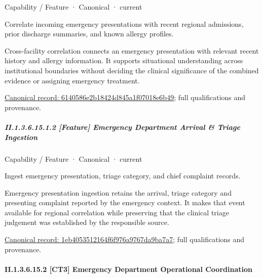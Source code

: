 \label{element:6140586e2b18424d845a1f07018e6b49}
{\small Capability / Feature · Canonical · current}\par

Correlate incoming emergency presentations with recent regional admissions, prior discharge summaries, and known allergy profiles.



Cross-facility correlation connects an emergency presentation with relevant recent history and allergy information. It supports situational understanding across institutional boundaries without deciding the clinical significance of the combined evidence or assigning emergency treatment.


{\footnotesize \href{../../../../continuum/strategy/capability/feature/6140586e2b18424d845a1f07018e6b49.md}{Canonical record: 6140586e2b18424d845a1f07018e6b49}; full qualifications and provenance.}\par
\subparagraph*{II.1.3.6.15.1.2 [Feature] Emergency Department Arrival \& Triage Ingestion}
\label{navigation:II.1.3.6.15.1.2}

\label{element:1eb4053512164f6f976a9767da9ba7a7}
{\small Capability / Feature · Canonical · current}\par

Ingest emergency presentation, triage category, and chief complaint records.



Emergency presentation ingestion retains the arrival, triage category and presenting complaint reported by the emergency context. It makes that event available for regional correlation while preserving that the clinical triage judgement was established by the responsible source.


{\footnotesize \href{../../../../continuum/strategy/capability/feature/1eb4053512164f6f976a9767da9ba7a7.md}{Canonical record: 1eb4053512164f6f976a9767da9ba7a7}; full qualifications and provenance.}\par
\paragraph*{II.1.3.6.15.2 [CT3] Emergency Department Operational Coordination}
\label{navigation:II.1.3.6.15.2}

